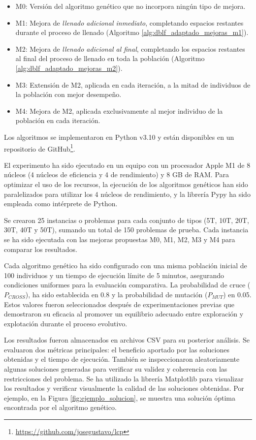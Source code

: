 \documentclass[openany]{article}
\begin{document}
\begin{itemize}
    \item M0: Versión del algoritmo genético que no incorpora ningún tipo de mejora.
    \item M1: Mejora de \textit{llenado adicional inmediato}, completando espacios restantes durante el proceso de llenado (Algoritmo \ref{alg:dblf_adaptado_mejoras_m1}).
    \item M2: Mejora de \textit{llenado adicional al final}, completando los espacios restantes al final del proceso de llenado en toda la población (Algoritmo \ref{alg:dblf_adaptado_mejoras_m2}).
    \item M3: Extensión de M2, aplicada en cada iteración, a la mitad de individuos de la población con mejor desempeño.
    \item M4: Mejora de M2, aplicada exclusivamente al mejor individuo de la población en cada iteración.
\end{itemize}

Los algoritmos se implementaron en Python v3.10 y están disponibles en un repositorio de GitHub\footnote{\url{https://github.com/josegustavo/lcp}}.

El experimento ha sido ejecutado en un equipo con un procesador Apple M1 de 8 núcleos (4 núcleos de eficiencia y 4 de rendimiento) y 8 GB de RAM. Para optimizar el uso de los recursos, la ejecución de los algoritmos genéticos han sido paralelizados para utilizar los 4 núcleos de rendimiento, y la librería Pypy ha sido empleada como intérprete de Python.

Se crearon 25 instancias o problemas para cada conjunto de tipos (5T, 10T, 20T, 30T, 40T y 50T), sumando un total de 150 problemas de prueba. Cada instancia se ha sido ejecutada con las mejoras propuestas M0, M1, M2, M3 y M4 para comparar los resultados.

Cada algoritmo genético ha sido configurado con una misma población inicial de 100 individuos y un tiempo de ejecución límite de 5 minutos, asegurando condiciones uniformes para la evaluación comparativa. La probabilidad de cruce ($P_{CROSS}$), ha sido establecida en 0.8 y la probabilidad de mutación ($P_{MUT}$) en 0.05. Estos valores fueron seleccionados después de experimentaciones previas que demostraron su eficacia al promover un equilibrio adecuado entre exploración y explotación durante el proceso evolutivo.

Los resultados fueron almacenados en archivos CSV para su posterior análisis. Se evaluaron dos métricas principales: el beneficio aportado por las soluciones obtenidas y el tiempo de ejecución. También se inspeccionaron aleatoriamente algunas soluciones generadas para verificar su validez y coherencia con las restricciones del problema. Se ha utilizado la librería Matplotlib para visualizar los resultados y verificar visualmente la calidad de las soluciones obtenidas. Por ejemplo, en la Figura \ref{fig:ejemplo_solucion}, se muestra una solución óptima encontrada por el algoritmo genético.
\end{document}

